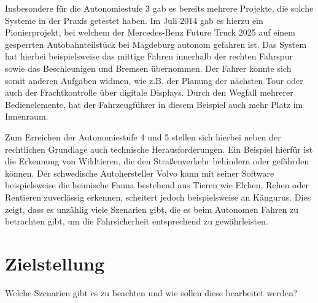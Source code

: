 Insbesondere für die Autonomiestufe 3 gab es bereits mehrere Projekte, die solche Systeme in der Praxis getestet haben. Im Juli 2014
gab es hierzu ein Pionierprojekt, bei welchem der Mercedes-Benz Future Truck 2025 auf einem gesperrten Autobahnteilstück bei Magdeburg 
autonom gefahren ist. Das System hat hierbei beispielsweise das mittige Fahren innerhalb der rechten Fahrspur sowie das Beschleunigen
und Bremsen übernommen. Der Fahrer konnte sich somit anderen Aufgaben widmen, wie z.B. der Planung der nächsten Tour oder auch der
Frachtkontrolle über digitale Displays. Durch den Wegfall mehrerer Bedienelemente, hat der Fahrzeugführer in diesem Beispiel auch mehr
Platz im Innenraum. \cite{benz-ft2025}

Zum Erreichen der Autonomiestufe 4 und 5 stellen sich hierbei neben der rechtlichen Grundlage auch technische Herausforderungen.
Ein Beispiel hierfür ist die Erkennung von Wildtieren, die den Straßenverkehr behindern oder gefährden können. Der schwedische
Autohersteller Volvo kann mit seiner Software beispielsweise die heimische Fauna bestehend aus Tieren wie Elchen, Rehen oder Rentieren
zuverlässig erkennen, scheitert jedoch beispielsweise an Kängurus. \cite{volvo-detection-report} 
Dies zeigt, dass es unzählig viele Szenarien gibt, die es beim Autonomen Fahren zu betrachten gibt, um die Fahrsicherheit entsprechend
zu gewährleisten.


\section{Zielstellung}
Welche Szenarien gibt es zu beachten und wie sollen diese bearbeitet werden?
